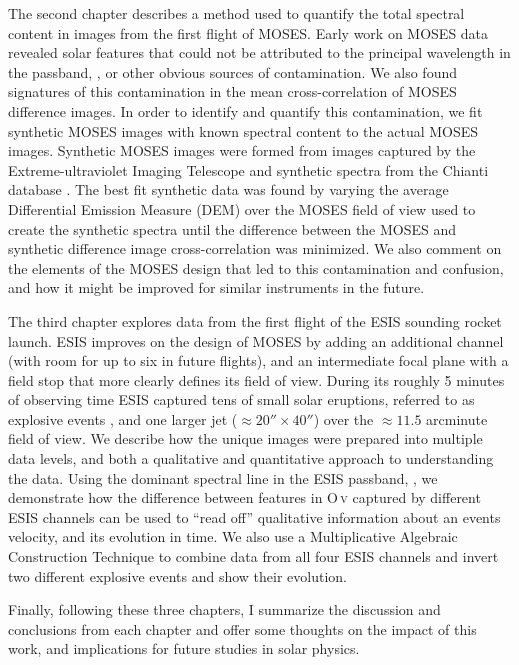 The second chapter describes a method used to quantify the total spectral content in images from the first flight of MOSES.
Early work on MOSES data revealed solar features that could not be attributed to the principal wavelength in the passband, , or other obvious sources of contamination. 
We also found signatures of this contamination in the mean cross-correlation of MOSES difference images.
In order to identify and quantify this contamination, we fit synthetic MOSES images with known spectral content to the actual MOSES images.
Synthetic MOSES images were formed from images captured by the Extreme-ultraviolet Imaging Telescope \citep[EIT:][]{EIT} and synthetic spectra from the Chianti database \citep{ChiantiI,ChiantiX}.
The best fit synthetic data was found by varying the average Differential Emission Measure (DEM) over the MOSES field of view used to create the synthetic spectra until the difference between the MOSES and synthetic difference image cross-correlation was minimized.
We also comment on the elements of the MOSES design that led to this contamination and confusion, and how it might be improved for similar instruments in the future.

The third chapter explores data from the first flight of the ESIS sounding rocket launch. 
ESIS improves on the design of MOSES by adding an additional channel (with room for up to six in future flights), and an intermediate focal plane with a field stop that more clearly defines its field of view.
During its roughly 5 minutes of observing time ESIS captured tens of small solar eruptions, referred to as explosive events \citep{Dere1989}, and one larger jet ($\approx 20''\times40''$) over the $\approx11.5$ arcminute field of view.
We describe how the unique images were prepared into multiple data levels, and both a qualitative and quantitative approach to understanding the data.
Using the dominant spectral line in the ESIS passband, , we demonstrate how the difference between features in O\,\textsc{v} captured by different ESIS channels can be used to ``read off'' qualitative information about an events velocity, and its evolution in time.
We also use a Multiplicative Algebraic Construction Technique \citep[MART:][]{Okamoto1991,Verhoeven1993} to combine data from all four ESIS channels and invert two different explosive events and show their evolution.

Finally, following these three chapters, I summarize the discussion and conclusions from each chapter and offer some thoughts on the impact of this work, and implications for future studies in solar physics.








